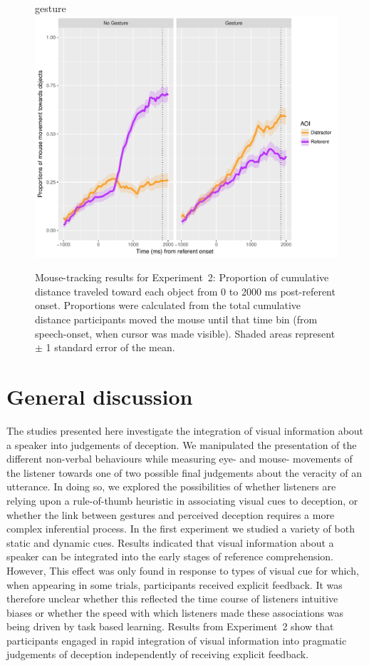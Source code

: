 \documentclass[a4paper,man,natbib]{apa6}
\begin{document}
\begin{figure}[Ht]gesture
  \centering
	\includegraphics[width=\linewidth]{./img/e8_mouset.pdf}
  \caption{Mouse-tracking results for Experiment~2: Proportion of cumulative distance traveled toward each object from 0 to 2000 ms post-referent onset. Proportions were calculated from the total cumulative distance participants moved the mouse until that time bin (from speech-onset, when cursor was made visible). Shaded areas represent $\pm$ 1 standard error of the mean.}
  \label{fig:v2_mouse}
\end{figure}


\section{General discussion}
The studies presented here investigate the integration of visual information about a speaker into judgements of deception.
We manipulated the presentation of the different non-verbal behaviours while measuring eye- and mouse- movements of the listener towards one of two possible final judgements about the veracity of an utterance.
In doing so, we explored the possibilities of whether listeners are relying upon a rule-of-thumb heuristic in associating visual cues to deception, or whether the link between gestures and perceived deception requires a more complex inferential process.
In the first experiment we studied a variety of both static and dynamic cues.
Results indicated that visual information about a speaker can be integrated into the early stages of reference comprehension.
However, This effect was only found in response to types of visual cue for which, when appearing in some trials, participants received explicit feedback.
It was therefore unclear whether this reflected the time course of listeners intuitive biases or whether the speed with which listeners made these associations was being driven by task based learning.
Results from Experiment~2 show that participants engaged in rapid integration of visual information into pragmatic judgements of deception independently of receiving explicit feedback. 
\end{document}
